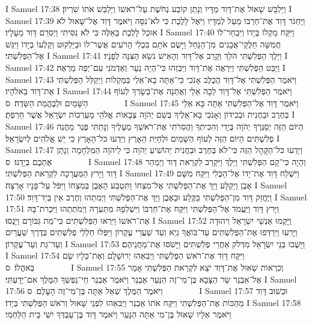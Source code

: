 I Samuel 17:38	וַיַּלְבֵּשׁ שָׁאוּל אֶת־דָּוִד מַדָּיו וְנָתַן קוֹבַע נְחֹשֶׁת עַל־רֹאשׁוֹ וַיַּלְבֵּשׁ אֹתוֹ שִׁרְיוֹן׃
I Samuel 17:39	וַיַּחְגֹּר דָּוִד אֶת־חַרְבּוֹ מֵעַל לְמַדָּיו וַיֹּאֶל לָלֶכֶת כִּי לֹא־נִסָּה וַיֹּאמֶר דָּוִד אֶל־שָׁאוּל לֹא אוּכַל לָלֶכֶת בָּאֵלֶּה כִּי לֹא נִסִּיתִי וַיְסִרֵם דָּוִד מֵעָלָיו׃
I Samuel 17:40	וַיִּקַּח מַקְלוֹ בְּיָדוֹ וַיִּבְחַר־לוֹ חֲמִשָּׁה חַלֻּקֵי־אֲבָנִים  מִן־הַנַּחַל וַיָּשֶׂם אֹתָם בִּכְלִי הָרֹעִים אֲשֶׁר־לוֹ וּבַיַּלְקוּט וְקַלְעוֹ בְיָדוֹ וַיִּגַּשׁ אֶל־הַפְּלִשְׁתִּי׃
I Samuel 17:41	וַיֵּלֶךְ הַפְּלִשְׁתִּי הֹלֵךְ וְקָרֵב אֶל־דָּוִד וְהָאִישׁ נֹשֵׂא הַצִּנָּה לְפָנָיו׃
I Samuel 17:42	וַיַּבֵּט הַפְּלִשְׁתִּי וַיִּרְאֶה אֶת־דָּוִד וַיִּבְזֵהוּ כִּי־הָיָה נַעַר וְאַדְמֹנִי עִם־יְפֵה מַרְאֶה׃
I Samuel 17:43	וַיֹּאמֶר הַפְּלִשְׁתִּי אֶל־דָּוִד הֲכֶלֶב אָנֹכִי כִּי־אַתָּה בָא־אֵלַי בַּמַּקְלוֹת וַיְקַלֵּל הַפְּלִשְׁתִּי אֶת־דָּוִד בֵּאלֹהָיו׃
I Samuel 17:44	וַיֹּאמֶר הַפְּלִשְׁתִּי אֶל־דָּוִד לְכָה אֵלַי וְאֶתְּנָה אֶת־בְּשָׂרְךָ לְעוֹף הַשָּׁמַיִם וּלְבֶהֱמַת הַשָּׂדֶה׃ {ס}        
I Samuel 17:45	וַיֹּאמֶר דָּוִד אֶל־הַפְּלִשְׁתִּי אַתָּה בָּא אֵלַי בְּחֶרֶב וּבַחֲנִית וּבְכִידוֹן וְאָנֹכִי בָא־אֵלֶיךָ בְּשֵׁם יְהֹוָה צְבָאוֹת אֱלֹהֵי מַעַרְכוֹת יִשְׂרָאֵל אֲשֶׁר חֵרַפְתָּ׃
I Samuel 17:46	הַיּוֹם הַזֶּה יְסַגֶּרְךָ יְהֹוָה בְּיָדִי וְהִכִּיתִךָ וַהֲסִרֹתִי אֶת־רֹאשְׁךָ מֵעָלֶיךָ וְנָתַתִּי פֶּגֶר מַחֲנֵה פְלִשְׁתִּים הַיּוֹם הַזֶּה לְעוֹף הַשָּׁמַיִם וּלְחַיַּת הָאָרֶץ וְיֵדְעוּ כּל־הָאָרֶץ כִּי יֵשׁ אֱלֹהִים לְיִשְׂרָאֵל׃
I Samuel 17:47	וְיֵדְעוּ כּל־הַקָּהָל הַזֶּה כִּי־לֹא בְּחֶרֶב וּבַחֲנִית יְהוֹשִׁיעַ יְהֹוָה כִּי לַיהֹוָה הַמִּלְחָמָה וְנָתַן אֶתְכֶם בְּיָדֵנוּ׃ {ס}        
I Samuel 17:48	וְהָיָה כִּי־קָם הַפְּלִשְׁתִּי וַיֵּלֶךְ וַיִּקְרַב לִקְרַאת דָּוִד וַיְמַהֵר דָּוִד וַיָּרץ הַמַּעֲרָכָה לִקְרַאת הַפְּלִשְׁתִּי׃
I Samuel 17:49	וַיִּשְׁלַח דָּוִד אֶת־יָדוֹ אֶל־הַכֶּלִי וַיִּקַּח מִשָּׁם אֶבֶן וַיְקַלַּע וַיַּךְ אֶת־הַפְּלִשְׁתִּי אֶל־מִצְחוֹ וַתִּטְבַּע הָאֶבֶן בְּמִצְחוֹ וַיִּפֹּל עַל־פָּנָיו אָרְצָה׃
I Samuel 17:50	וַיֶּחֱזַק דָּוִד מִן־הַפְּלִשְׁתִּי בַּקֶּלַע וּבָאֶבֶן וַיַּךְ אֶת־הַפְּלִשְׁתִּי וַיְמִתֵהוּ וְחֶרֶב אֵין בְּיַד־דָּוִד׃
I Samuel 17:51	וַיָּרץ דָּוִד וַיַּעֲמֹד אֶל־הַפְּלִשְׁתִּי וַיִּקַּח אֶת־חַרְבּוֹ וַיִּשְׁלְפָהּ מִתַּעְרָהּ וַיְמֹתְתֵהוּ וַיִּכְרת־בָּהּ אֶת־רֹאשׁוֹ וַיִּרְאוּ הַפְּלִשְׁתִּים כִּי־מֵת גִּבּוֹרָם וַיָּנֻסוּ׃
I Samuel 17:52	וַיָּקֻמוּ אַנְשֵׁי יִשְׂרָאֵל וִיהוּדָה וַיָּרִעוּ וַיִּרְדְּפוּ אֶת־הַפְּלִשְׁתִּים עַד־בּוֹאֲךָ גַיְא וְעַד שַׁעֲרֵי עֶקְרוֹן וַיִּפְּלוּ חַלְלֵי פְלִשְׁתִּים בְּדֶרֶךְ שַׁעֲרַיִם וְעַד־גַּת וְעַד־עֶקְרוֹן׃
I Samuel 17:53	וַיָּשֻׁבוּ בְּנֵי יִשְׂרָאֵל מִדְּלֹק אַחֲרֵי פְלִשְׁתִּים וַיָּשֹׁסּוּ אֶת־מַחֲנֵיהֶם׃
I Samuel 17:54	וַיִּקַּח דָּוִד אֶת־רֹאשׁ הַפְּלִשְׁתִּי וַיְבִאֵהוּ יְרוּשָׁלָ͏ִם וְאֶת־כֵּלָיו שָׂם בְּאהֳלוֹ׃ {ס}        
I Samuel 17:55	וְכִרְאוֹת שָׁאוּל אֶת־דָּוִד יֹצֵא לִקְרַאת הַפְּלִשְׁתִּי אָמַר אֶל־אַבְנֵר שַׂר הַצָּבָא בֶּן־מִי־זֶה הַנַּעַר אַבְנֵר וַיֹּאמֶר אַבְנֵר חֵי־נַפְשְׁךָ הַמֶּלֶךְ אִם־יָדָעְתִּי׃
I Samuel 17:56	וַיֹּאמֶר הַמֶּלֶךְ שְׁאַל אַתָּה בֶּן־מִי־זֶה הָעָלֶם׃ {ס}        
I Samuel 17:57	וּכְשׁוּב דָּוִד מֵהַכּוֹת אֶת־הַפְּלִשְׁתִּי וַיִּקַּח אֹתוֹ אַבְנֵר וַיְבִאֵהוּ לִפְנֵי שָׁאוּל וְרֹאשׁ הַפְּלִשְׁתִּי בְּיָדוֹ׃
I Samuel 17:58	וַיֹּאמֶר אֵלָיו שָׁאוּל בֶּן־מִי אַתָּה הַנָּעַר וַיֹּאמֶר דָּוִד בֶּן־עַבְדְּךָ יִשַׁי בֵּית הַלַּחְמִי׃
